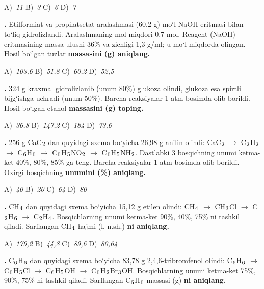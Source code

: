 \documentclass[11pt,a4paper]{article}
\renewcommand{\textsubscript}[1]{\ensuremath{_{\text{\fontsize{8}{8}\selectfont #1}}}}
\newcommand{\qn}[1]{\textbf{\fontsize{11.5}{13}\selectfont #1}}
\newcommand{\qsep}{\par\vspace{13pt}}
\begin{document}
\begin{multicols}{2}
\noindent A)~\textsl{11} \hfill B)~\textsl{3} \hfill C)~\textsl{6} \hfill D)~\textsl{7}\par
\qsep
\noindent\qn{24.} Etilformiat va propilatsetat aralashmasi (60,2 g) mo`l NaOH eritmasi bilan to`liq gidrolizlandi. Aralashmaning mol miqdori 0,7 mol. Reagent (NaOH) eritmasining massa ulushi 36\% va zichligi 1,3 g/ml; u mo`l miqdorda olingan. Hosil bo`lgan tuzlar \textbf{massasini (g) aniqlang.}

\noindent A)~\textsl{103,6} \hfill B)~\textsl{51,8} \hfill C)~\textsl{60,2} \hfill D)~\textsl{52,5}\par
\qsep
\noindent\qn{25.} 324 g kraxmal gidrolizlanib (unum 80\%) glukoza olindi, glukoza esa spirtli bijg`ishga uchradi (unum 50\%). Barcha reaksiyalar 1 atm bosimda olib borildi. Hosil bo`lgan etanol \textbf{massasini (g) toping.}

\noindent A)~\textsl{36,8} \hfill B)~\textsl{147,2} \hfill C)~\textsl{184} \hfill D)~\textsl{73,6}\par
\qsep
\noindent\qn{26.} 256 g CaC\textsubscript{2} dan quyidagi sxema bo`yicha 26,98 g anilin olindi: CaC\textsubscript{2} $\to$ C\textsubscript{2}H\textsubscript{2} $\to$ C\textsubscript{6}H\textsubscript{6} $\to$ C\textsubscript{6}H\textsubscript{5}NO\textsubscript{2} $\to$ C\textsubscript{6}H\textsubscript{5}NH\textsubscript{2}. Dastlabki 3 bosqichning unumi ketma-ket 40\%, 80\%, 85\% ga teng. Barcha reaksiyalar 1 atm bosimda olib borildi. Oxirgi bosqichning \textbf{unumini (\%) aniqlang.}

\noindent A)~\textsl{40} \hfill B)~\textsl{20} \hfill C)~\textsl{64} \hfill D)~\textsl{80}\par
\qsep
\noindent\qn{27.} CH\textsubscript{4} dan quyidagi sxema bo`yicha 15,12 g etilen olindi: CH\textsubscript{4} $\to$ CH\textsubscript{3}Cl $\to$ C\textsubscript{2}H\textsubscript{6} $\to$ C\textsubscript{2}H\textsubscript{4}. Bosqichlarning unumi ketma-ket 90\%, 40\%, 75\% ni tashkil qiladi. Sarflangan CH\textsubscript{4} hajmi (l, n.sh.) \textbf{ni aniqlang.}

\noindent A)~\textsl{179,2} \hfill B)~\textsl{44,8} \hfill C)~\textsl{89,6} \hfill D)~\textsl{80,64}\par
\qsep
\noindent\qn{28.} C\textsubscript{6}H\textsubscript{6} dan quyidagi sxema bo`yicha 83,78 g 2,4,6-tribromfenol olindi: C\textsubscript{6}H\textsubscript{6} $\to$ C\textsubscript{6}H\textsubscript{5}Cl $\to$ C\textsubscript{6}H\textsubscript{5}OH $\to$ C\textsubscript{6}H\textsubscript{2}Br\textsubscript{3}OH. Bosqichlarning unumi ketma-ket 75\%, 90\%, 75\% ni tashkil qiladi. Sarflangan C\textsubscript{6}H\textsubscript{6} massasi (g) \textbf{ni aniqlang.}


\end{multicols}
\end{document}
